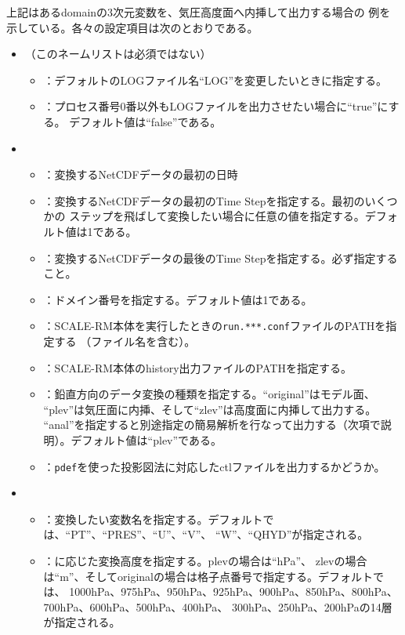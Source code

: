 \noindent 上記はあるdomainの3次元変数を、気圧高度面へ内挿して出力する場合の
例を示している。各々の設定項目は次のとおりである。
\begin{itemize}
 \item {}（このネームリストは必須ではない）
 \begin{itemize}
  \item {}：デフォルトのLOGファイル名``LOG''を変更したいときに指定する。
  \item {}：プロセス番号0番以外もLOGファイルを出力させたい場合に``true''にする。
        デフォルト値は``false''である。
 \end{itemize}
 \item {}
 \begin{itemize}
  \item {}：変換するNetCDFデータの最初の日時
  \item {}：変換するNetCDFデータの最初のTime Stepを指定する。最初のいくつかの
        ステップを飛ばして変換したい場合に任意の値を指定する。デフォルト値は1である。
  \item {}：変換するNetCDFデータの最後のTime Stepを指定する。必ず指定すること。
  \item {}：ドメイン番号を指定する。デフォルト値は1である。
  \item {}：SCALE-RM本体を実行したときの\verb|run.***.conf|ファイルのPATHを指定する
        （ファイル名を含む）。
  \item {}：SCALE-RM本体のhistory出力ファイルのPATHを指定する。
  \item {}：鉛直方向のデータ変換の種類を指定する。``original''はモデル面、
        ``plev''は気圧面に内挿、そして``zlev''は高度面に内挿して出力する。
        ``anal''を指定すると別途指定の簡易解析を行なって出力する（次項で説明）。デフォルト値は``plev''である。
  \item {}：\verb|pdef|を使った投影図法に対応したctlファイルを出力するかどうか。
 \end{itemize}
 \item {}
 \begin{itemize}
  \item {}：変換したい変数名を指定する。デフォルトでは、``PT''、``PRES''、``U''、``V''、
        ``W''、``QHYD''が指定される。
  \item {}：に応じた変換高度を指定する。plevの場合は``hPa''、
        zlevの場合は``m''、そしてoriginalの場合は格子点番号で指定する。デフォルトでは、
        1000hPa、975hPa、950hPa、925hPa、900hPa、850hPa、800hPa、700hPa、600hPa、500hPa、400hPa、
        300hPa、250hPa、200hPaの14層が指定される。
 \end{itemize}
\end{itemize}

